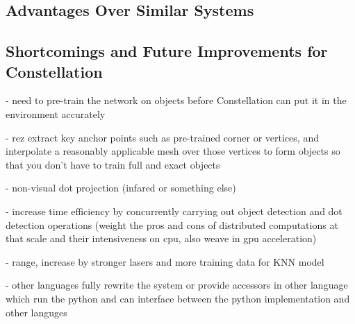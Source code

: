 \subsection{Advantages Over Similar Systems}
\subsection{Shortcomings and Future Improvements for Constellation}
- need to pre-train the network on objects before Constellation can put it in the environment accurately

- re^^: extract key anchor points such as pre-trained corner or vertices, and interpolate a reasonably applicable mesh over those vertices to form objects so that you don't have to train full and exact objects

- non-visual dot projection (infared or something else)

- increase time efficiency by concurrently carrying out object detection and dot detection operations (weight the pros and cons of distributed computations at that scale and their intensiveness on cpu, also weave in gpu acceleration)

- range, increase by stronger lasers and more training data for KNN model

- other languages fully rewrite the system or provide accessors in other language which run the python and can interface between the python implementation and other languges